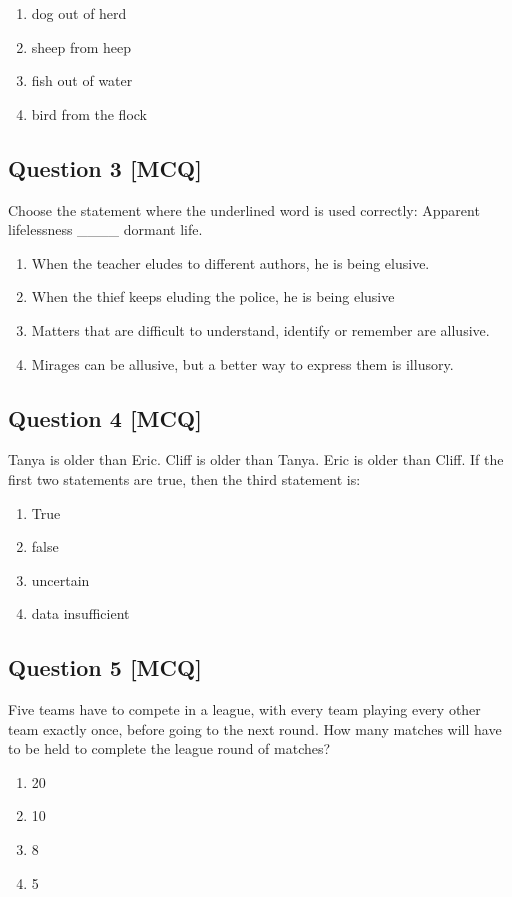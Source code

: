 \documentclass[12pt,a4paper]{article}
\begin{document}
\begin{enumerate}[label=(\alph*)]
\item dog out of herd
\item sheep from heep
\item fish out of water
\item bird from the flock
\end{enumerate}

\subsection*{Question 3 [MCQ]}
Choose the statement where the underlined word is used correctly: 
Apparent lifelessness \_\_\_\_ dormant life.
\begin{enumerate}[label=(\alph*)]
\item When the teacher eludes to different authors, he is being elusive.
\item When the thief keeps eluding the police, he is being elusive 
\item Matters that are difficult to understand, identify or remember are allusive.
\item Mirages can be allusive, but a better way to express them is illusory.
\end{enumerate}

\subsection*{Question 4 [MCQ]}
Tanya is older than Eric.
Cliff is older than Tanya.
Eric is older than Cliff.
If the first two statements are true, then the third statement is:
\begin{enumerate}[label=(\alph*)]
\item True
\item false  
\item uncertain
\item data insufficient
\end{enumerate}

\subsection*{Question 5 [MCQ]}Five teams have to compete in a league, with every team playing every other team exactly once, before going to the next round. How many matches will have to be held to complete the league round of matches?

\begin{enumerate}[label=(\alph*)]
\item 20
\item 10  
\item 8
\item 5
\end{enumerate}
\end{document}
